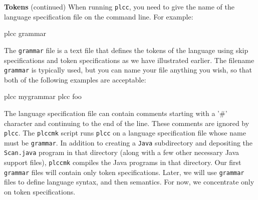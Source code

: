 \begin{minipage}[t]{\sw}
\slidenumber
\LARGE
{\bf Tokens} (continued)\exx
When running \verb'plcc', you need to give the name
of the language specification file on the command line.
For example:
\begin{qv}
plcc grammar
\end{qv}
The \verb'grammar' file is a text file
that defines the tokens of the language
using skip specifications and token specifications
as we have illustrated earlier.
The filename \verb'grammar' is typically used,
but you can name your file anything you wish,
so that both of the following examples are acceptable:
\begin{qv}
plcc mygrammar
plcc foo
\end{qv}
The language specification file can contain
comments starting with a '\#' character
and continuing to the end of the line.
These comments are ignored by \verb'plcc'.\exx
The \verb'plccmk' script runs \verb'plcc'
on a language specification file
whose name must be \verb'grammar'.
In addition to creating a \verb'Java' subdirectory
and depositing the \verb'Scan.java' program in that directory
(along with a few other necessary Java support files),
\verb'plccmk' compiles the Java programs in that directory.
Our first \verb'grammar' files will contain only
token specifications.
Later, we will use \verb'grammar' files
to define language syntax, and then semantics.
For now, we concentrate only on token specifications.

\end{minipage}
\clearpage
